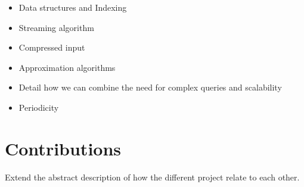 \begin{itemize}
\item Data structures and Indexing
\item Streaming algorithm
\item Compressed input
\item Approximation algorithms
\end{itemize}

\begin{itemize}
    \item Detail how we can combine the need for complex queries and scalability
    \item Periodicity
\end{itemize}

\section{Contributions}

Extend the abstract description of how the different project relate to each other.
